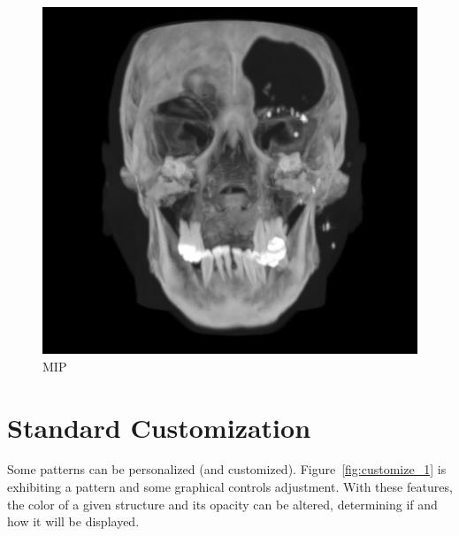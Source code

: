 \begin{figure}[!htb]
\centering
\includegraphics[scale=0.55]{../user_guide_figures/invesalius_screen/MIP.jpg}
\caption{MIP}
\label{fig:MIP}
\end{figure}

\newpage

\section{Standard Customization}

Some patterns can be personalized (and customized). Figure~\ref{fig:customize_1} is exhibiting a pattern and some graphical controls adjustment. With these features, the color of a given structure and its opacity can be altered, determining if and how it will be displayed.

